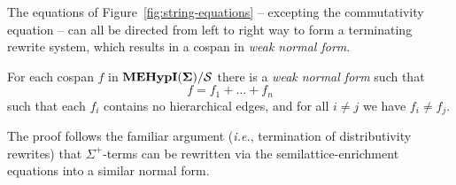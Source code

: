 The equations of Figure~\ref{fig:string-equations} -- excepting the commutativity equation -- can all be directed from left to right way to form a terminating rewrite system,  which results in a cospan in \textit{weak normal form}. 
\begin{proposition}
\label{prop:wnormal_form}
For each cospan $f$ in ${{\mathbf{MEHypI(\Sigma)}}}/{\mathcal{S}}$ there is a \textit{weak normal form} such that 
\[
	f = f_1 + \ldots + f_n
\]
 such that each $f_i$ contains no hierarchical edges,  and for all $i \neq j$ we have $f_i \neq f_j$.
\end{proposition}    
The proof follows the familiar argument (\textit{i.e.},  termination of distributivity rewrites) that $\Sigma^+$-terms can be rewritten via the semilattice-enrichment equations into a similar normal form.  

